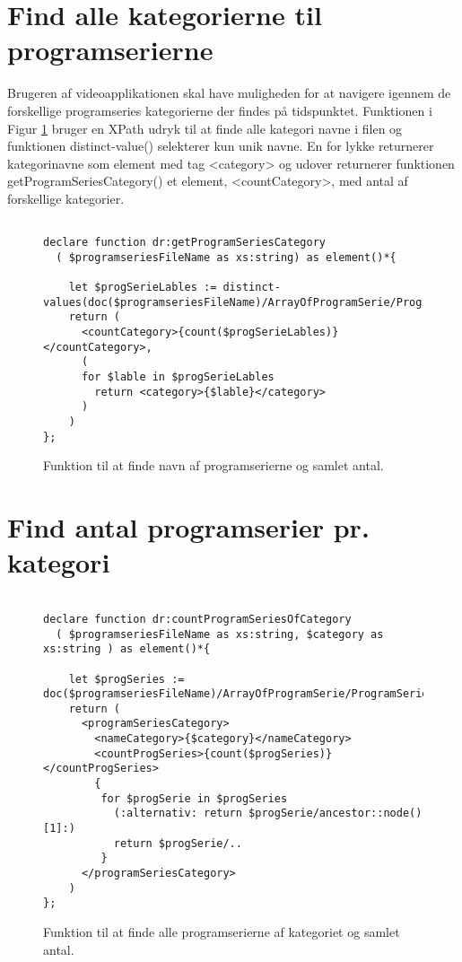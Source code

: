 
\section{Find alle kategorierne til programserierne}
Brugeren af videoapplikationen skal have muligheden for at navigere igennem de forskellige 
programseries kategorierne der findes på tidspunktet. Funktionen i Figur \ref{xquerySearch:getProgramSeriesCategory} bruger en XPath udryk til at finde alle kategori navne i filen og funktionen distinct-value() selekterer kun unik navne. En for lykke returnerer kategorinavne som element med tag <category> og udover returnerer funktionen getProgramSeriesCategory() et element, <countCategory>, med antal af forskellige kategorier. 


\begin{figure}[ht]
\begin{lstlisting}[style=FAKE_XQUERY, language=XQUERY]

declare function dr:getProgramSeriesCategory
  ( $programseriesFileName as xs:string) as element()*{
    
    let $progSerieLables := distinct-values(doc($programseriesFileName)/ArrayOfProgramSerie/ProgramSerie/Labels/string/text())
    return (
      <countCategory>{count($progSerieLables)}</countCategory>,
      (
      for $lable in $progSerieLables
        return <category>{$lable}</category>
      )
    )
};

\end{lstlisting}
\caption{Funktion til at finde navn af programserierne og samlet antal.}
\label{xquerySearch:getProgramSeriesCategory}
\end{figure}



\section{Find antal programserier pr. kategori}


\begin{figure}[ht]
\begin{lstlisting}[style=FAKE_XQUERY, language=XQUERY]

declare function dr:countProgramSeriesOfCategory
  ( $programseriesFileName as xs:string, $category as xs:string ) as element()*{
    
    let $progSeries := doc($programseriesFileName)/ArrayOfProgramSerie/ProgramSerie/Labels[string=$category]
    return (
      <programSeriesCategory>
        <nameCategory>{$category}</nameCategory>
        <countProgSeries>{count($progSeries)}</countProgSeries>
        {
         for $progSerie in $progSeries
           (:alternativ: return $progSerie/ancestor::node()[1]:)
           return $progSerie/..
         }
      </programSeriesCategory>
    )
};

\end{lstlisting}
\caption{Funktion til at finde alle programserierne af kategoriet og samlet antal.}
\label{xquerySearch:countProgramSeriesOfCategory}
\end{figure}


